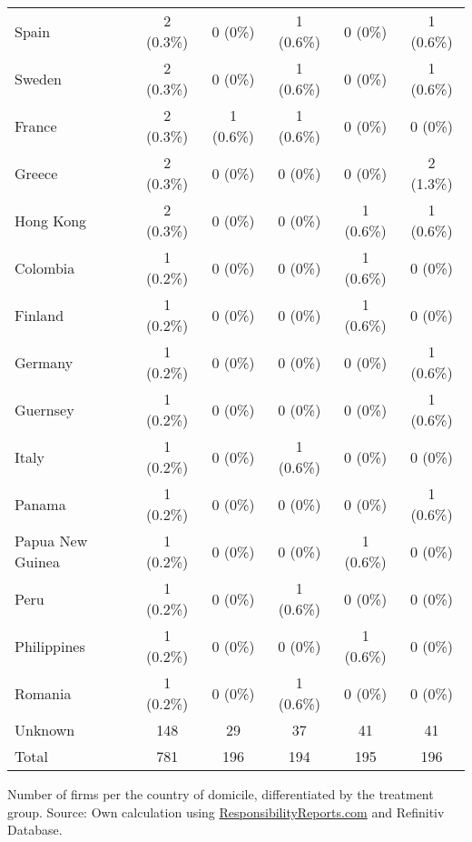\documentclass[12pt]{article}
\begin{document}
\begin{table}
{\begin{tabular}{lccccc}
    Spain & 2 (0.3\%) & 0 (0\%) & 1 (0.6\%) & 0 (0\%) & 1 (0.6\%)\\
    Sweden & 2 (0.3\%) & 0 (0\%) & 1 (0.6\%) & 0 (0\%) & 1 (0.6\%)\\
    France & 2 (0.3\%) & 1 (0.6\%) & 1 (0.6\%) & 0 (0\%) & 0 (0\%)\\
    Greece & 2 (0.3\%) & 0 (0\%) & 0 (0\%) & 0 (0\%) & 2 (1.3\%)\\
    Hong Kong & 2 (0.3\%) & 0 (0\%) & 0 (0\%) & 1 (0.6\%) & 1 (0.6\%)\\
    Colombia & 1 (0.2\%) & 0 (0\%) & 0 (0\%) & 1 (0.6\%) & 0 (0\%)\\
    Finland & 1 (0.2\%) & 0 (0\%) & 0 (0\%) & 1 (0.6\%) & 0 (0\%)\\
    Germany & 1 (0.2\%) & 0 (0\%) & 0 (0\%) & 0 (0\%) & 1 (0.6\%)\\
    Guernsey & 1 (0.2\%) & 0 (0\%) & 0 (0\%) & 0 (0\%) & 1 (0.6\%)\\
    Italy & 1 (0.2\%) & 0 (0\%) & 1 (0.6\%) & 0 (0\%) & 0 (0\%)\\
    Panama & 1 (0.2\%) & 0 (0\%) & 0 (0\%) & 0 (0\%) & 1 (0.6\%)\\
    Papua New Guinea & 1 (0.2\%) & 0 (0\%) & 0 (0\%) & 1 (0.6\%) & 0 (0\%)\\
    Peru & 1 (0.2\%) & 0 (0\%) & 1 (0.6\%) & 0 (0\%) & 0 (0\%)\\
    Philippines & 1 (0.2\%) & 0 (0\%) & 0 (0\%) & 1 (0.6\%) & 0 (0\%)\\
    Romania & 1 (0.2\%) & 0 (0\%) & 1 (0.6\%) & 0 (0\%) & 0 (0\%)\\
    Unknown & 148 & 29 & 37 & 41 & 41\\
    \midrule
    Total & 781 & 196 &  194 & 195 & 196\\
    \bottomrule
    \end{tabular}

    \vspace{0.2cm}
    
    \begin{tablenotes}
        \footnotesize
        \item Number of firms per the country of domicile, differentiated by the treatment group. Source: Own calculation using \href{https://responsibilityreports.com}{ResponsibilityReports.com} and Refinitiv Database.
    \end{tablenotes}
    
    
    }
\end{table}

\newpage
\end{document}
